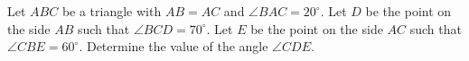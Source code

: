 Let $ABC$ be a triangle with $AB=AC$ and $\angle BAC=20^\circ$.
Let $D$ be the point on the side $AB$ such that $\angle BCD = 70^\circ$.
Let $E$ be the point on the side $AC$ such that $\angle CBE = 60^\circ$.
Determine the value of the angle $\angle CDE$.
